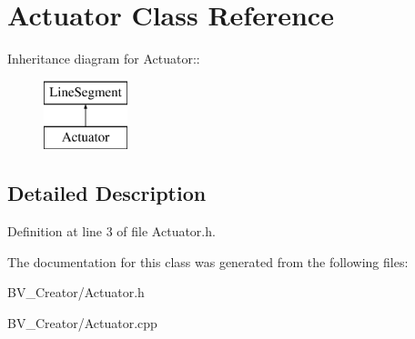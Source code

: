 \hypertarget{class_actuator}{
\section{Actuator Class Reference}
\label{class_actuator}
}
Inheritance diagram for Actuator::\begin{figure}[H]
\begin{center}
\leavevmode
\includegraphics[height=2cm]{class_actuator}
\end{center}
\end{figure}


\subsection{Detailed Description}


Definition at line 3 of file Actuator.h.

The documentation for this class was generated from the following files:\begin{DoxyCompactItemize}
\item 
BV\_\-Creator/Actuator.h\item 
BV\_\-Creator/Actuator.cpp\end{DoxyCompactItemize}
